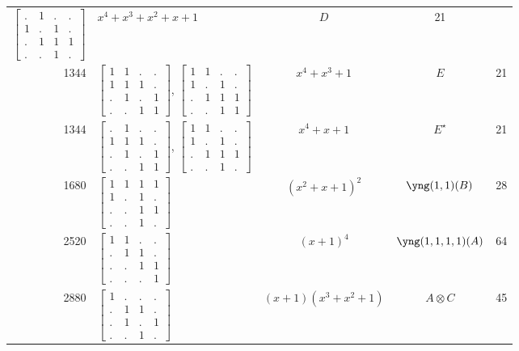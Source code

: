 \documentclass[11pt,oneside]{article}
\newcommand{\tensor}{\otimes}
\begin{document}
\begin{center}
\begin{tabular}{r|l|c|c|c}
$\begin{bmatrix}.&1&.&.\\1&.&1&.\\.&1&1&1\\.&.&1&.\end{bmatrix}$
& $x^4+x^3+x^2+x+1$  & $D$ & 21  \\
1344  & 
$\begin{bmatrix}1&1&.&.\\1&1&1&.\\.&1&.&1\\.&.&1&1\end{bmatrix}$,
$\begin{bmatrix}1&1&.&.\\1&.&1&.\\.&1&1&1\\.&.&1&1\end{bmatrix}$
& $x^4+x^3+1$        & $E$ & 21  \\
1344  & 
$\begin{bmatrix}.&1&.&.\\1&1&1&.\\.&1&.&1\\.&.&1&1\end{bmatrix}$,
$\begin{bmatrix}1&1&.&.\\1&.&1&.\\.&1&1&1\\.&.&1&.\end{bmatrix}$
& $x^4+x+1$          & $E^\star$ & 21  \\
1680  & $\begin{bmatrix}1&1&1&1\\1&.&1&.\\.&.&1&1\\.&.&1&.\end{bmatrix}$  & $(x^2+x+1)^2$  & $\yng(1,1)(B)$ & 28  \\
2520  & $\begin{bmatrix}1&1&.&.\\.&1&1&.\\.&.&1&1\\.&.&.&1\end{bmatrix}$  & $(x+1)^4$  & $\yng(1,1,1,1)(A)$ & 64   \\
2880  & $\begin{bmatrix}1&.&.&.\\.&1&1&.\\.&1&.&1\\.&.&1&.\end{bmatrix}$
  & $(x+1)(x^3+x^2+1)$  & $A\tensor C$ & 45   \\

\end{tabular}
\end{center}
\end{document}
